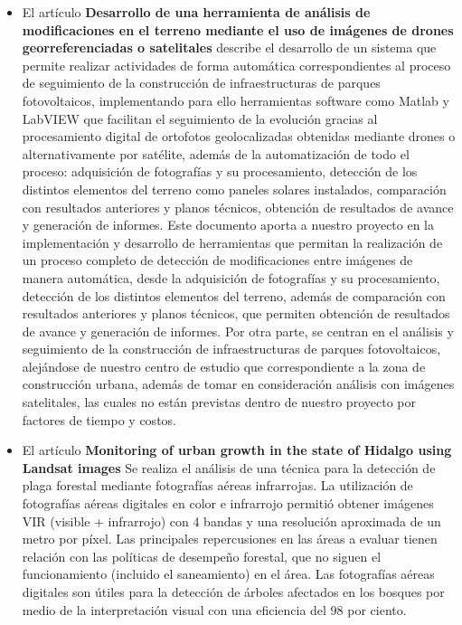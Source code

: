 \begin{itemize}
    \item El artículo \textbf{Desarrollo de una herramienta de análisis de modificaciones en el terreno mediante el uso de imágenes de drones georreferenciadas o satelitales}  \cite{prostychenko_automatizacion_nodate} describe el desarrollo de un sistema que permite realizar actividades de forma automática correspondientes al proceso de seguimiento de la construcción de infraestructuras de parques fotovoltaicos, implementando para ello herramientas  software como Matlab y LabVIEW que facilitan el seguimiento de la evolución gracias al procesamiento digital de ortofotos geolocalizadas obtenidas mediante drones o alternativamente por satélite, además de la automatización de todo el proceso: adquisición de fotografías y su procesamiento, detección de los distintos elementos del terreno como paneles solares instalados, comparación con resultados anteriores y planos técnicos, obtención de resultados de avance y generación de informes.
    Este documento aporta a nuestro proyecto en la implementación y desarrollo de herramientas que permitan la realización de un proceso completo de detección de modificaciones entre imágenes de manera automática, desde la adquisición de fotografías y su procesamiento, detección de los distintos elementos del terreno, además de comparación con resultados anteriores y planos técnicos, que permiten obtención de resultados de avance y generación de informes. Por otra parte, se centran en el análisis y seguimiento de la construcción de infraestructuras de parques fotovoltaicos, alejándose de nuestro centro de estudio que correspondiente a la zona de construcción urbana, además de tomar en consideración análisis con imágenes satelitales, las cuales no están previstas dentro de nuestro proyecto por factores de tiempo y costos.
    \item El artículo \textbf{Monitoring of urban growth in the state of Hidalgo using Landsat images}\cite{LeautaudValenzuela2017} Se realiza el análisis de una técnica para la detección de plaga forestal mediante fotografías aéreas infrarrojas.  La utilización de fotografías aéreas digitales en color e infrarrojo permitió obtener imágenes VIR (visible + infrarrojo) con 4 bandas y una resolución aproximada de un metro por píxel. Las principales repercusiones en las áreas a evaluar tienen relación con las políticas de desempeño forestal, que no siguen el funcionamiento (incluido el saneamiento) en el área. Las fotografías aéreas digitales son útiles para la detección de árboles afectados en los bosques por medio de la interpretación visual con una eficiencia del 98 por ciento. 

\end{itemize}
